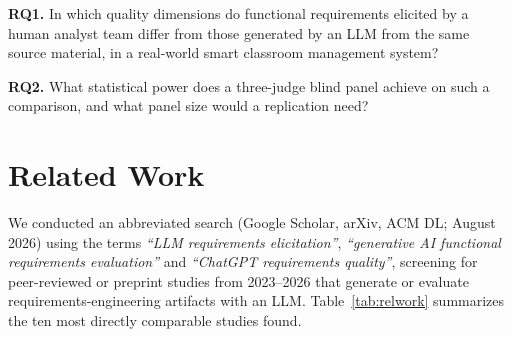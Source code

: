 \documentclass{llncs}
\begin{document}
\textbf{RQ1.} In which quality dimensions do functional requirements elicited by a
human analyst team differ from those generated by an LLM from the same source material,
in a real-world smart classroom management system?

\textbf{RQ2.} What statistical power does a three-judge blind panel achieve on such a
comparison, and what panel size would a replication need?

\section{Related Work}

We conducted an abbreviated search (Google Scholar, arXiv, ACM DL; August 2026) using
the terms \emph{``LLM requirements elicitation''}, \emph{``generative AI functional
requirements evaluation''} and \emph{``ChatGPT requirements quality''}, screening for
peer-reviewed or preprint studies from 2023--2026 that generate or evaluate
requirements-engineering artifacts with an LLM. Table~\ref{tab:relwork} summarizes the
ten most directly comparable studies found.
\end{document}
